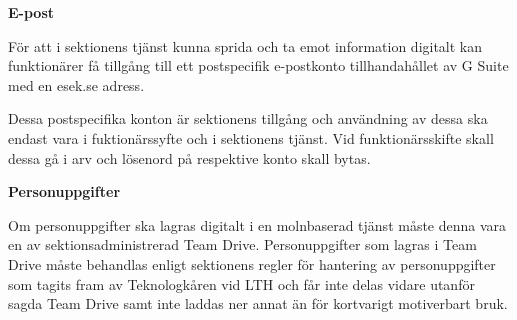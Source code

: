 \documentclass[../_main/handlingar.tex]{subfiles}
\begin{document}
    \vspace{10px}
    {\Large \textbf{E-post}}
    \vspace{6px}

    För att i sektionens tjänst kunna sprida och ta emot information digitalt kan funktionärer få tillgång till ett postspecifik e-postkonto tillhandahållet av G Suite med en esek.se adress. 

    Dessa postspecifika konton är sektionens tillgång och användning av dessa ska endast vara i fuktionärssyfte och i sektionens tjänst. 
    Vid funktionärsskifte skall dessa gå i arv och lösenord på respektive konto skall bytas. 
    
    
    \vspace{6px}
    {\Large \textbf{Personuppgifter}}

    \vspace{6px}
    Om personuppgifter ska lagras digitalt i en molnbaserad tjänst måste denna vara en av sektionsadministrerad Team Drive. 
    Personuppgifter som lagras i Team Drive måste behandlas enligt sektionens regler för hantering av personuppgifter som tagits fram av Teknologkåren vid LTH och får inte delas vidare utanför sagda Team Drive samt inte laddas ner annat än för kortvarigt motiverbart bruk.
\end{document}
